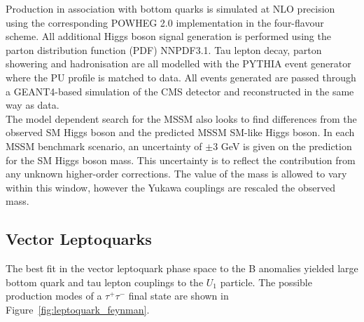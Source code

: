 Production in association with bottom quarks is simulated at NLO precision using the corresponding POWHEG 2.0 implementation in the four-flavour scheme.
All additional Higgs boson signal generation is performed using the parton distribution function (PDF) NNPDF3.1.
Tau lepton decay, parton showering and hadronisation are all modelled with the PYTHIA event generator where the PU profile is matched to data.
All events generated are passed through a GEANT4-based simulation of the CMS detector and reconstructed in the same way as data. \\

The model dependent search for the MSSM also looks to find differences from the observed SM Higgs boson and the predicted MSSM SM-like Higgs boson.
In each MSSM benchmark scenario, an uncertainty of $\pm 3$ GeV is given on the prediction for the SM Higgs boson mass.
This uncertainty is to reflect the contribution from any unknown higher-order corrections.
The value of the mass is allowed to vary within this window, however the Yukawa couplings are rescaled the observed mass.

\subsection{Vector Leptoquarks}
\label{sec:vlq}

The best fit in the vector leptoquark phase space to the B anomalies yielded large bottom quark and tau lepton couplings to the $U_1$ particle.
The possible production modes of a $\tau^+\tau^-$ final state are shown in Figure~\ref{fig:leptoquark_feynman}.


